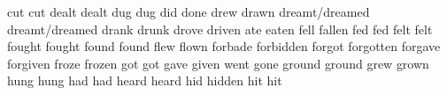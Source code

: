 	            {cut}{}	                {cut}{}                 {}{}
	            {dealt}{}	            {dealt}{}               {}{}
	            {dug}{}	                {dug}{}                 {}{}
	                {did}{}	                {done}{}                {}{}
	            {drew}{}	            {drawn}{}               {}{}
	            {dreamt/dreamed}{}	    {dreamt/dreamed}{}      {}{}
	            {drank}{}	            {drunk}{}               {}{}
	            {drove}{}	            {driven}{}              {}{}
	            {ate}{}	                {eaten}{}               {}{}
	            {fell}{}	            {fallen}{}              {}{}
	            {fed}{}	                {fed}{}                 {}{}
	            {felt}{}	            {felt}{}                {}{}
	            {fought}{}	            {fought}{}              {}{}
	            {found}{}	            {found}{}               {}{}
	            {flew}{}	            {flown}{}               {}{}
	            {forbade}{}	            {forbidden}{}           {}{}
	            {forgot}{}	            {forgotten}{}           {}{}
	        {forgave}{}	            {forgiven}{}            {}{}
	            {froze}{}	            {frozen}{}              {}{}
	            {got}{}	                {got}{}                 {}{}
	            {gave}{}	            {given}{}               {}{}
	                {went}{}	            {gone}{}                {}{}
	            {ground}{}	            {ground}{}              {}{}
	            {grew}{}	            {grown}{}               {}{}
	            {hung}{}	            {hung}{}                {}{}
	            {had}{}	                {had}{}                 {}{}
	            {heard}{}	            {heard}{}               {}{}
	            {hid}{}	                {hidden}{}              {}{}
	            {hit}{}	                {hit}{}                 {}{}
